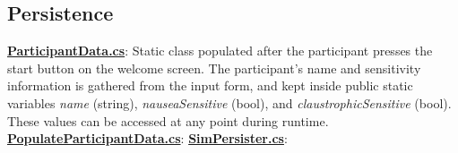 \documentclass{article}
\begin{document}
\subsection*{Persistence} %
\href{https://bit.ly/2Fhq8B2}{\textbf{ParticipantData.cs}}: Static class populated after the participant presses the start button on the welcome screen. The participant's name and sensitivity information is gathered from the input form, and kept inside public static variables \textit{name} (string), \textit{nauseaSensitive} (bool), and \textit{claustrophicSensitive} (bool). These values can be accessed at any point during runtime. \newline \newline
\href{https://bit.ly/2WgL6qR}{\textbf{PopulateParticipantData.cs}}:  \newline \newline
\href{https://bit.ly/2OdbwH6}{\textbf{SimPersister.cs}}:
\end{document}
